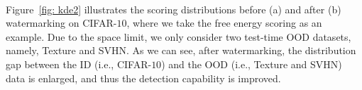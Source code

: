 \documentclass{article}
\begin{document}
\begin{figure*}[t]
\centering  
{} 
~~~~~~~~~~~~~~~~
\caption{An illustration on CIFAR-$10$ dataset regarding the free energy scoring. (a) depicts the scoring distributions before watermarking, and (b) is the scoring distributions after watermarking. } \label{fig: kde2}
\end{figure*}




Figure~\ref{fig: kde2} illustrates the scoring distributions before (a) and after (b) watermarking on CIFAR-$10$, where we take the free energy scoring as an example. Due to the space limit, we only consider two test-time OOD datasets, namely, Texture and SVHN. As we can see, after watermarking, the distribution gap between the ID (i.e., CIFAR-$10$) and the OOD (i.e., Texture and SVHN) data is enlarged, and thus the detection capability is improved.
\end{document}
